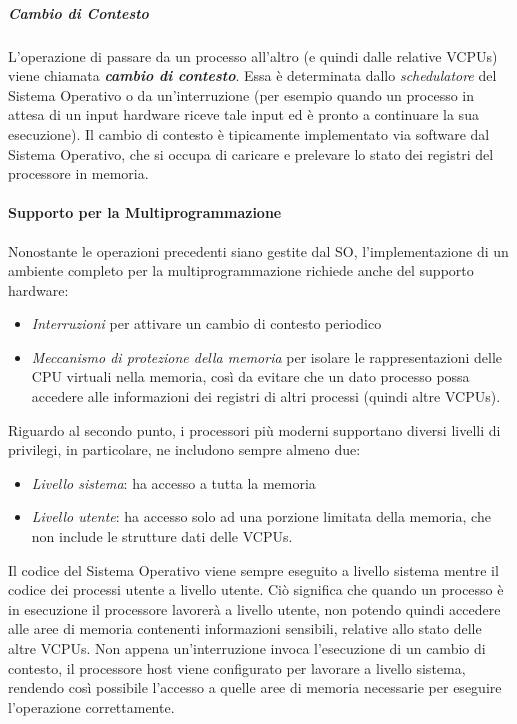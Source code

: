 \documentclass{article}
\begin{document}
\subparagraph{Cambio di Contesto}
L’operazione di passare da un processo all’altro (e quindi dalle relative VCPUs) viene chiamata \textit{\textbf{cambio di contesto}}.
Essa è determinata dallo \textit{schedulatore} del Sistema Operativo o da un’interruzione (per esempio quando un processo in attesa di un input hardware riceve tale input ed è pronto a continuare la sua esecuzione).
Il cambio di contesto è tipicamente implementato via software dal Sistema Operativo, che si occupa di caricare e prelevare lo stato dei registri del processore in memoria.

\paragraph{Supporto per la Multiprogrammazione}
Nonostante le operazioni precedenti siano gestite dal SO, l’implementazione di un ambiente completo per la multiprogrammazione richiede anche del supporto hardware:
\begin{itemize}
    \item{\textit{Interruzioni} per attivare un cambio di contesto periodico}
    \item{\textit{Meccanismo di protezione della memoria} per isolare le rappresentazioni delle CPU virtuali nella memoria, così da evitare che un dato processo possa accedere alle informazioni dei registri di altri processi (quindi altre VCPUs).}
\end{itemize}
Riguardo al secondo punto, i processori più moderni supportano diversi livelli di privilegi, in particolare, ne includono sempre almeno due:
\begin{itemize}
    \item{\textit{Livello sistema}: ha accesso a tutta la memoria}
    \item{\textit{Livello utente}: ha accesso solo ad una porzione limitata della memoria, che non include le strutture dati delle VCPUs.}
\end{itemize}
Il codice del Sistema Operativo viene sempre eseguito a livello sistema mentre il codice dei processi utente a livello utente.
Ciò significa che quando un processo è in esecuzione il processore lavorerà a livello utente, non potendo quindi accedere alle aree di memoria contenenti informazioni sensibili, relative allo stato delle altre VCPUs. Non appena un’interruzione invoca l’esecuzione di un cambio di contesto, il processore host viene configurato per lavorare a livello sistema, rendendo così possibile l’accesso a quelle aree di memoria necessarie per eseguire l’operazione correttamente.
\end{document}
